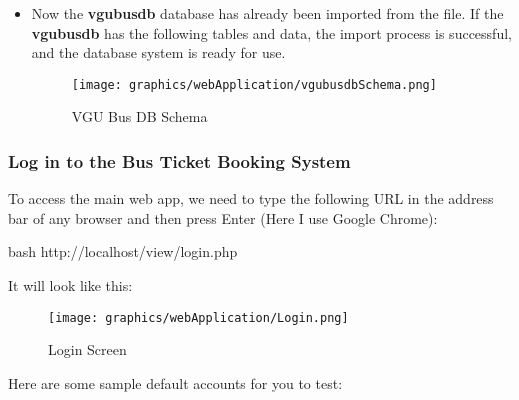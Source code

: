 \begin{itemize}
    \item Now the \textbf{vgubusdb} database has already been imported from the file. If the \textbf{vgubusdb} has the following tables and data, the import process is successful, and the database system is ready for use. 
    \begin{figure}[H]
            \centering
            \texttt{[image: graphics/webApplication/vgubusdbSchema.png]}
            \caption{VGU Bus DB Schema}
        \label{fig:vgubusdbschema}
    \end{figure}
    
    
\end{itemize}


\subsubsection{Log in to the Bus Ticket Booking System}
To access the main web app, we need to type the following URL in the address bar of any browser and then press Enter (Here I use Google Chrome): 
    \begin{code}{bash}
        http://localhost/view/login.php
    \end{code}

    It will look like this:

    \begin{figure}[H]
            \centering
            \texttt{[image: graphics/webApplication/Login.png]}
            \caption{Login Screen}
        \label{fig:loginscreen}
    \end{figure}

    Here are some sample default accounts for you to test:

